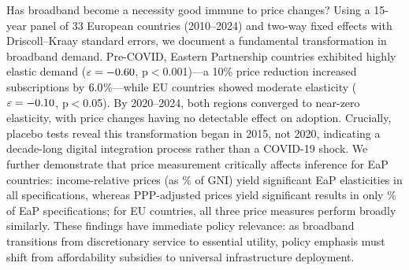 Has broadband become a necessity good immune to price changes? Using a 15-year panel of 33 European countries (2010--2024) and two-way fixed effects with Driscoll--Kraay standard errors, we document a fundamental transformation in broadband demand. Pre-COVID, Eastern Partnership countries exhibited highly elastic demand ($\varepsilon = -0.60$, p$<$0.001)---a 10\% price reduction increased subscriptions by $6.0$\%---while EU countries showed moderate elasticity ($\varepsilon = -0.10$, p$<$0.05). By 2020--2024, both regions converged to near-zero elasticity, with price changes having no detectable effect on adoption. Crucially, placebo tests reveal this transformation began in 2015, not 2020, indicating a decade-long digital integration process rather than a COVID-19 shock. We further demonstrate that price measurement critically affects inference for EaP countries: income-relative prices (as \% of GNI) yield significant EaP elasticities in all specifications, whereas PPP-adjusted prices yield significant results in only \PctPPPSigEaP\% of EaP specifications; for EU countries, all three price measures perform broadly similarly. These findings have immediate policy relevance: as broadband transitions from discretionary service to essential utility, policy emphasis must shift from affordability subsidies to universal infrastructure deployment.
